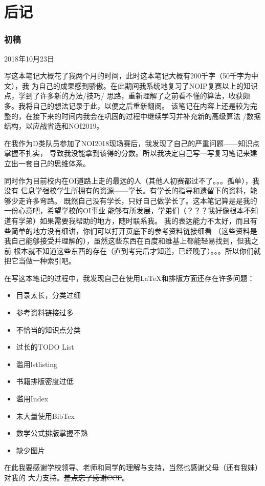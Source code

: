 \chapter{后记}
\subsection{初稿}
2018年10月23日

写这本笔记大概花了我两个月的时间，此时这本笔记大概有200千字（50千字为中文），我
为自己的成果感到骄傲。在此期间我系统地复习了NOIP复赛以上的知识点，学到了许多新的方法/技巧/
思路，重新理解了之前看不懂的算法，收获颇多。我将自己的想法记录于此，以便之后重新翻阅。
该笔记在内容上还是较为完整的，在接下来的时间内我会在巩固的过程中继续学习并补充新的高级算法
/数据结构，以应战省选和NOI2019。

在我作为D类队员参加了NOI2018现场赛后，我发现了自己的严重问题——知识点掌握不扎实，
导致我没能拿到该得的分数。所以我决定自己写一写复习笔记来建立出一套自己的思维体系。

同时作为目前校内在OI道路上走的最远的人（其他人初赛都过不了。。。孤单），我没有
信息学强校学生所拥有的资源——学长。有学长的指导和遗留下的资料，能够少走许多弯路。
既然自己没有学长，只好自己做学长了。这本笔记算是是我的一份心意吧，希望学校的OI事业
能够有所发展，学弟们（？？？我好像根本不知道有学弟）如果需要我帮助的地方，随时联系我。
我的表达能力不太好，而且有些简单的地方没有细讲，你们可以打开页底下的参考资料链接细看
（这些资料是我自己能够接受并理解的），虽然这些东西在百度和维基上都能轻易找到，但我之前
根本就不知道这些东西的存在（直到考完后才知道，已经晚了）。。。所以你们就把它当做一种索引吧。

在写这本笔记的过程中，我发现自己在使用\LaTeX{}和排版方面还存在许多问题：
\begin{itemize}
    \item 目录太长，分类过细
    \item 参考资料链接过多
    \item 不恰当的知识点分类
    \item 过长的TODO List
    \item 滥用lstlisting
    \item 书籍排版密度过低
    \item 滥用Index
    \item 未大量使用BibTex
    \item 数学公式排版掌握不熟
    \item 缺少图片
\end{itemize}

在此我要感谢学校领导、老师和同学的理解与支持，当然也感谢父母（还有我妹）对我的
大力支持。\sout{差点忘了感谢CCF}。

